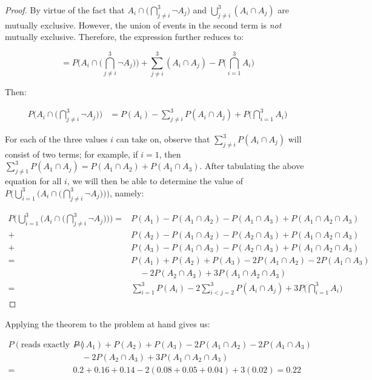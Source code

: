 \documentclass[10pt, oneside]{article}
\begin{document}
\begin{enumerate}[label=3.\arabic*]
\begin{proof}
By virtue of the fact that $A_i  \cap \Big( \bigcap^3_{j \neq i} \neg A_j \Big)$ and $\bigcup^3_{j \neq i} (A_i \cap A_j)$ are mutually exclusive. However, the union of events in the second term is \textit{not} mutually exclusive. Therefore, the expression further reduces to:

\[ = P\Bigg( A_i  \cap \Big( \bigcap^3_{j \neq i} \neg A_j \Big) \Bigg) + \sum^3_{j \neq i} (A_i \cap A_j) - P\Bigg( \bigcap^3_{i = 1} A_i \Bigg) \]

Then:

\begin{align*}
P \Bigg( A_i  \cap \Big( \bigcap^3_{j \neq i} \neg A_j \Big) \Bigg) &= P(A_i) - \sum^3_{j \neq i} P(A_i \cap A_j) + P \Bigg( \bigcap^3_{i=1} A_i \Bigg)
\end{align*}

For each of the three values $i$ can take on, observe that $\sum^3_{j \neq i} P(A_i \cap A_j)$ will consist of two terms; for example, if $i = 1$, then $\sum^3_{j \neq 1} P(A_1 \cap A_j) = P(A_1 \cap A_2) + P(A_1 \cap A_3)$. After tabulating the above equation for all $i$, we will then be able to determine the value of $P \Bigg( \bigcup^3_{i=1} \bigg( A_i  \cap \Big( \bigcap^3_{j \neq i} \neg A_j \Big) \bigg) \Bigg) $, namely:

\begin{align*}
P \Bigg( \bigcup^3_{i=1} \bigg( A_i  \cap \Big( \bigcap^3_{j \neq i} \neg A_j \Big) \bigg) \Bigg) = &P(A_1) - P(A_1 \cap A_2) - P(A_1 \cap A_3) + P(A_1 \cap A_2 \cap A_3) \\
+&P(A_2) - P(A_1 \cap A_2) - P(A_2 \cap A_3) + P(A_1 \cap A_2 \cap A_3) \\
+&P(A_3) - P(A_1 \cap A_3) - P(A_2 \cap A_3) + P(A_1 \cap A_2 \cap A_3) \\
= &P(A_1) + P(A_2) + P(A_3) - 2P(A_1 \cap A_2) - 2P(A_1 \cap A_3) \\
&\quad - 2P(A_2 \cap A_3) + 3P(A_1 \cap A_2 \cap A_3) \\
= &\boxed{ \sum^3_{i = 1} P(A_i) - 2 \sum^3_{i < j = 2} P(A_i \cap A_j) + 3 P\Bigg( \bigcap^3_{i=1} A_i \Bigg) }
\end{align*} 

\end{proof}

Applying the theorem to the problem at hand gives us:

\begin{align*}
P(\text{reads exactly one paper}) = &P(A_1) + P(A_2) + P(A_3) - 2P(A_1 \cap A_2) - 2P(A_1 \cap A_3) \\
&\quad - 2P(A_2 \cap A_3) + 3P(A_1 \cap A_2 \cap A_3) \\
= &0.2+0.16+0.14-2\left(0.08+0.05+0.04\right)+3\left(0.02\right) = \boxed{0.22}
\end{align*}


\end{enumerate}
\end{document}
